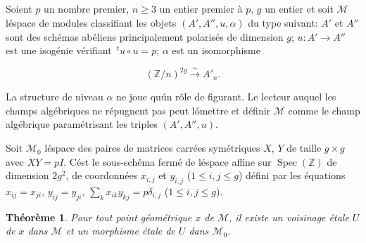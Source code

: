 \documentclass[11pt,a4paper]{article}
\theoremstyle{plain}
\newtheorem{theorem}{Th\'eor\`eme}
\theoremstyle{definition}
\DeclareMathOperator{\Spec}{Spec}
\begin{document}
\subsection{}

Soient $p$ un nombre premier, $n \geq 3$ un entier premier \`a $p$, $g$ un entier et soit
$\mathscr{M}$ l\'espace de modules classifiant les objets $(A', A'', u, \alpha)$ du type suivant: $A'$ et
$A''$ sont des sch\'emas ab\'eliens principalement polaris\'es de dimension $g$;
$u: A' \to A''$ est une isog\'enie v\'erifiant $\,\!^t u \circ u = p$; $\alpha$ est un isomorphisme

\begin{equation}
(\mathbb{Z}/n)^{2g} \xrightarrow{\sim} A'_n.
\end{equation}

La structure de niveau $\alpha$ ne joue qu\'un r\^ole de figurant. Le lecteur auquel les
champs alg\'ebriques ne r\'epugnent pas peut l\'omettre et d\'efinir $\mathscr{M}$ comme le
champ alg\'ebrique param\'etrisant les triples $(A', A'', u)$.

Soit $\mathscr{M}_0$ l\'espace des paires de matrices carr\'ees sym\'etriques $X$, $Y$ de taille
$g \times g$ avec $XY = pI$. C\'est le sous-sch\'ema ferm\'e de l\'espace affine sur $\Spec(\mathbb{Z})$
de dimension $2g^2$, de coordonn\'ees $x_{i,j}$ et $y_{i,j}$ ($1 \leq i, j \leq g$) d\'efini par les
\'equations $x_{ij} = x_{ji}$, $y_{ij} = y_{ji}$, $\sum_k x_{ik}y_{kj} = p\delta_{i,j}$ ($1 \leq i, j \leq g$).

\begin{theorem}
Pour tout point g\'eom\'etrique $x$ de $\mathscr{M}$, il existe un voisinage
\'etale $U$ de $x$ dans $\mathscr{M}$ et un morphisme \'etale de $U$ dans $\mathscr{M}_0$.
\end{theorem}
\end{document}
